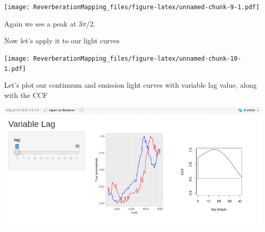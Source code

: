 \documentclass[]{article}
\newenvironment{Shaded}{\begin{snugshade}}{\end{snugshade}}
\newcommand{\DataTypeTok}[1]{\textcolor[rgb]{0.13,0.29,0.53}{#1}}
\newcommand{\DecValTok}[1]{\textcolor[rgb]{0.00,0.00,0.81}{#1}}
\newcommand{\KeywordTok}[1]{\textcolor[rgb]{0.13,0.29,0.53}{\textbf{#1}}}
\newcommand{\NormalTok}[1]{#1}
\newcommand{\OperatorTok}[1]{\textcolor[rgb]{0.81,0.36,0.00}{\textbf{#1}}}
\newcommand{\StringTok}[1]{\textcolor[rgb]{0.31,0.60,0.02}{#1}}
\begin{document}
\begin{Shaded}
\end{Shaded}

\texttt{[image: ReverberationMapping\_files/figure-latex/unnamed-chunk-9-1.pdf]}

Again we see a peak at \(3\pi/2\).

Now let's apply it to our light curves

\begin{Shaded}
\end{Shaded}

\texttt{[image: ReverberationMapping\_files/figure-latex/unnamed-chunk-10-1.pdf]}

Let's plot our continuum and emission light curves with variable lag
value, along with the CCF

\includegraphics{./laggif_screenshots/lagplots.gif}
\end{document}
